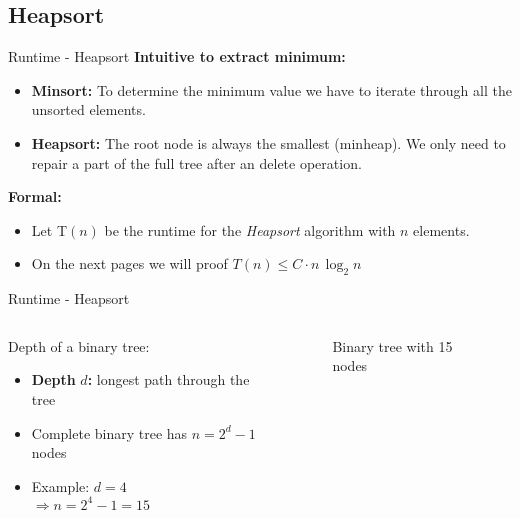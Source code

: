 \subsection{Heapsort}

\begin{frame}{Runtime - Heapsort}
  \textbf{Intuitive to extract minimum:}
  \begin{itemize}
    \item
      \textbf{Minsort:}
      To determine the minimum value we have to iterate through all the
      unsorted elements.
    \item
      \textbf{Heapsort:}
      The root node is always the smallest (minheap).
      We only need to repair a part of the full tree after an delete
      operation.
  \end{itemize}
  \textbf{Formal:}
  \begin{itemize}
    \item 
      Let {\color{MainA}T$(n)$} be the runtime for the \textit{Heapsort}
      algorithm with {\color{MainA}$n$} elements.
    \item
      On the next pages we will proof
	  {\color{MainA}$T(n) \leq C \cdot n \, \log_2 n$}
  \end{itemize}
\end{frame}


\begin{frame}{Runtime - Heapsort}
  \begin{columns}
    \begin{column}{0.5\textwidth}
      Depth of a binary tree:
      \begin{itemize}
        \item
          \textbf{Depth} {\color{MainA}$d$}\textbf{:}
          longest path through the tree
        \item
          Complete binary tree has {\color{MainA}$n = 2^d - 1$} nodes
        \item
          Example: {\color{MainA}$d = 4$}\\
          {\color{MainA}$\Rightarrow n = 2^4 - 1 = 15$}
      \end{itemize}
    \end{column}
    \begin{column}{0.5\textwidth}
      \begin{figure}
        \begin{adjustbox}{width=\linewidth}
        \end{adjustbox}
        \caption{Binary tree with 15 nodes}%
        \label{fig:binary_tree}%
      \end{figure}
    \end{column}
  \end{columns}
\end{frame}